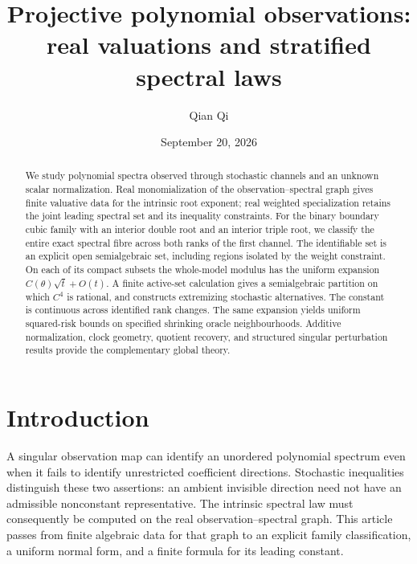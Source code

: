 
\title[Real valuations and stratified spectral laws]{Projective polynomial observations:\\ real valuations and stratified spectral laws}
\author{Qian Qi}
\date{September 20, 2026}

\begin{abstract}
We study polynomial spectra observed through stochastic channels and
an unknown scalar normalization. Real monomialization of the
observation--spectral graph gives finite valuative data for the
intrinsic root exponent; real weighted specialization retains the
joint leading spectral set and its inequality constraints. For the
binary boundary cubic family with an interior double root and an
interior triple root, we classify the entire exact spectral fibre
across both ranks of the first channel. The identifiable set is an
explicit open semialgebraic set, including regions isolated by the
weight constraint. On each of its compact subsets the whole-model
modulus has the uniform expansion $C(\theta)\sqrt t+O(t)$.
A finite active-set calculation gives a semialgebraic partition on
which $C^4$ is rational, and constructs extremizing stochastic
alternatives. The constant is continuous across identified rank
changes. The same expansion yields uniform squared-risk bounds on
specified shrinking oracle neighbourhoods. Additive normalization,
clock geometry, quotient recovery, and structured singular perturbation
results provide the complementary global theory.
\end{abstract}
\maketitle

\section{Introduction}
A singular observation map can identify an unordered polynomial
spectrum even when it fails to identify unrestricted coefficient
directions. Stochastic inequalities distinguish these two assertions:
an ambient invisible direction need not have an admissible nonconstant
representative. The intrinsic spectral law must consequently be
computed on the real observation--spectral graph. This article passes
from finite algebraic data for that graph to an explicit family
classification, a uniform normal form, and a finite formula for its
leading constant.

